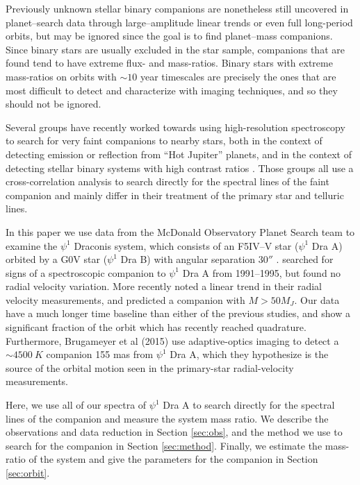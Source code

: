 \documentclass[twocolumn]{emulateapj}
\begin{document}
Previously unknown stellar binary companions are nonetheless still uncovered in planet--search data through large--amplitude linear trends or even full long-period orbits, but may be ignored since the goal is to find planet--mass companions. Since binary stars are usually excluded in the star sample, companions that are found tend to have extreme flux- and mass-ratios. Binary stars with extreme mass-ratios on orbits with $\sim 10$ year timescales are precisely the ones that are most difficult to detect and characterize with imaging techniques, and so they should not be ignored.

Several groups have recently worked towards using high-resolution spectroscopy to search for very faint companions to nearby stars, both in the context of detecting emission \citep{Snellen2010, Gullikson2013} or reflection \citep{Martins2013} from ``Hot Jupiter'' planets, and in the context of detecting stellar binary systems with high contrast ratios \citep[e.g.][]{Gullikson2013_2, Kolbl2015}. Those groups all use a cross-correlation analysis to search directly for the spectral lines of the faint companion and mainly differ in their treatment of the primary star and telluric lines.

In this paper we use data from the McDonald Observatory Planet Search team to examine the $\psi^1$ Draconis system, which consists of an F5IV--V star ($\psi^1$ Dra A) orbited by a G0V star ($\psi^1$ Dra B) with angular separation $30''$ \citep{WDS}. \cite{Tokovinin2002} searched for signs of a spectroscopic companion to $\psi^1$ Dra A from 1991--1995, but found no radial velocity variation. More recently \cite{Toyota2009} noted a linear trend in their radial velocity measurements, and predicted a companion with $M > 50 M_J$. Our data have a much longer time baseline than either of the previous studies, and show a significant fraction of the orbit which has recently reached quadrature. Furthermore, Brugameyer et al (2015) use adaptive-optics imaging to detect a $\sim 4500\ K$ companion 155 mas from $\psi^1$ Dra A, which they hypothesize is the source of the orbital motion seen in the primary-star radial-velocity measurements. 

Here, we use all of our spectra of $\psi^1$ Dra A to search directly for the spectral lines of the companion and measure the system mass ratio. We describe the observations and data reduction in Section \ref{sec:obs}, and the method we use to search for the companion in Section \ref{sec:method}. Finally, we estimate the mass-ratio of the system and give the parameters for the companion in Section \ref{sec:orbit}.
\end{document}
